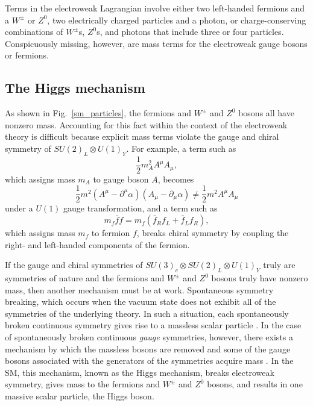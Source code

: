 Terms in the electroweak Lagrangian involve either two left-handed fermions and a $W^{\pm}$ or $Z^{0}$, two electrically charged particles and a photon, or charge-conserving combinations of $W^{\pm}$s, $Z^{0}$s, and photons that include three or four particles.  Conspicuously missing, however, are mass terms for the electroweak gauge bosons or fermions.

\subsection{The Higgs mechanism}
As shown in Fig.~\ref{sm_particles}, the fermions and $W^{\pm}$ and $Z^{0}$ bosons all have nonzero mass. Accounting for this fact within the context of the electroweak theory is difficult because explicit mass terms violate the gauge and chiral symmetry of $SU(2)_{L} \otimes U(1)_{Y}$. For example, a term such as
\begin{equation}
    \frac{1}{2}m_{A}^{2}A^{\mu}A_{\mu},
\end{equation}
which assigns mass $m_{A}$ to gauge boson $A$, becomes
\begin{equation}
    \frac{1}{2}m^{2}(A^{\mu}-\partial^{\mu}\alpha)(A_{\mu}-\partial_{\mu}\alpha) \neq \frac{1}{2}m^{2}A^{\mu}A_{\mu}
\end{equation}
under a $U(1)$ gauge transformation, and a term such as
\begin{equation}
    m_{f}\overline{f}f = m_{f}(\overline{f}_{R}f_{L} + \overline{f}_{L}f_{R}),
\end{equation}
which assigns mass $m_{f}$ to fermion $f$, breaks chiral symmetry by coupling the right- and left-handed components of the fermion.

If the gauge and chiral symmetries of $SU(3)_{c} \otimes SU(2)_{L} \otimes U(1)_{Y}$ truly are symmetries of nature and the fermions and $W^{\pm}$ and $Z^{0}$ bosons truly have nonzero mass, then another mechanism must be at work. Spontaneous symmetry breaking, which occurs when the vacuum state does not exhibit all of the symmetries of the underlying theory. In such a situation, each spontaneously broken continuous symmetry gives rise to a massless scalar particle \cite{goldstone_salam_weinberg}. In the case of spontaneously broken continuous \textit{gauge} symmetries, however, there exists a mechanism by which the massless bosons are removed and some of the gauge bosons associated with the generators of the symmetries acquire mass \cite{englert, higgs, kibble}. In the SM, this mechanism, known as the Higgs mechanism, breaks electroweak symmetry, gives mass to the fermions and $W^{\pm}$ and $Z^{0}$ bosons, and results in one massive scalar particle, the Higgs boson.

